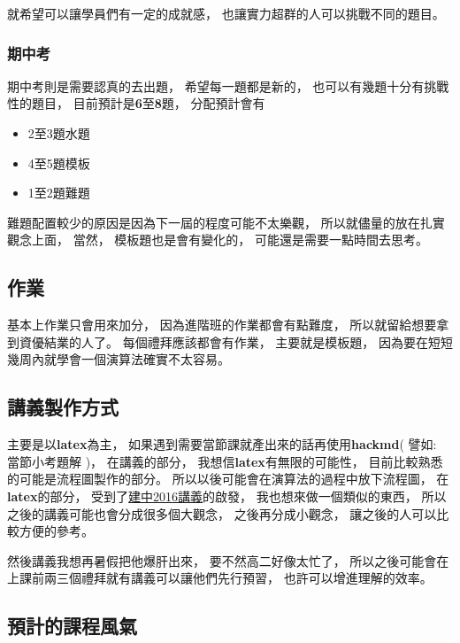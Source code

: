 \documentclass[12pt,oneside]{article}
\begin{document}
\noindent 就希望可以讓學員們有一定的成就感，
也讓實力超群的人可以挑戰不同的題目。

\subsubsection{期中考}

期中考則是需要認真的去出題，
希望每一題都是新的，
也可以有幾題十分有挑戰性的題目，
目前預計是\textbf{6}至\textbf{8}題，
分配預計會有
\begin{adjustwidth}{2em}{0em}
\begin{itemize}
    \item 2至3題水題
    \item 4至5題模板
    \item 1至2題難題
\end{itemize}
\end{adjustwidth}

\noindent 難題配置較少的原因是因為下一屆的程度可能不太樂觀，
所以就儘量的放在扎實觀念上面，
當然，
模板題也是會有變化的，
可能還是需要一點時間去思考。




\subsection{作業}

基本上作業只會用來加分，
因為進階班的作業都會有點難度，
所以就留給想要拿到資優結業的人了。
每個禮拜應該都會有作業，
主要就是模板題，
因為要在短短幾周內就學會一個演算法確實不太容易。

\clearpage
\subsection{講義製作方式}

主要是以\textbf{latex}為主，
如果遇到需要當節課就產出來的話再使用\textbf{hackmd}( 譬如: 當節小考題解 )，
在講義的部分，
我想信\textbf{latex}有無限的可能性，
目前比較熟悉的可能是流程圖製作的部分。
所以以後可能會在演算法的過程中放下流程圖，
在\textbf{latex}的部分，
受到了\href{https://tioj.ck.tp.edu.tw/articles/5}{建中2016講義}的啟發，
我也想來做一個類似的東西，
所以之後的講義可能也會分成很多個大觀念，
之後再分成小觀念，
讓之後的人可以比較方便的參考。

\vspace*{2.5em}
然後講義我想再暑假把他爆肝出來，
要不然高二好像太忙了，
所以之後可能會在上課前兩三個禮拜就有講義可以讓他們先行預習，
也許可以增進理解的效率。

\subsection{預計的課程風氣}
\end{document}
